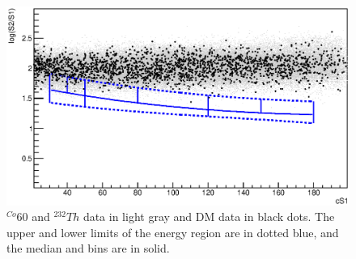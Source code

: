 \begin{table}

\caption{Bins definition. The estimated background event is calculated by taking the calibration sample and scaling it by $6.54e-3$, which is a the ration between data and calibration in a sideband. The number of data events is the number of events from the DM data set in each bin.} \label{table:BinDef}

\end{table}


\begin{figure}[h!]
\begin{minipage}{1.\linewidth}
\centerline{\includegraphics[width=1.\linewidth]{Figures/phasespace.eps}}
\end{minipage}
\caption{$^{Co}60$ and $^{232}Th$ data in light gray and DM data in black dots. The upper and lower limits of the energy region are in dotted blue, and the median and bins are in solid.}
\label{fig:phasespace}
\end{figure}  



